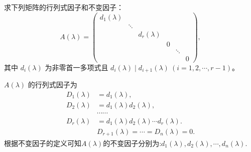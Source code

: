 \documentclass[../../main.tex]{subfiles}
\begin{document}
\begin{proposition}\label{proposition:相抵标准型的行列式因子和不变因子}
求下列矩阵的行列式因子和不变因子：
\[
A(\lambda)=\begin{pmatrix}
d_1(\lambda) & & & & \\
& \ddots & & & \\
& & d_r(\lambda) & & \\
& & & 0 & \\
& & & & \ddots & \\
& & & & & 0
\end{pmatrix},
\]
其中 $d_i(\lambda)$ 为非零首一多项式且 $d_i(\lambda)\mid d_{i + 1}(\lambda)\ (i = 1, 2, \cdots, r - 1)$。
\end{proposition}
\begin{solution}
$A(\lambda)$ 的行列式因子为
\begin{align*}
D_1(\lambda)&=d_1(\lambda),\\
D_2(\lambda)&=d_1(\lambda)d_2(\lambda),\\
&\cdots\cdots\\
D_r(\lambda)&=d_1(\lambda)d_2(\lambda)\cdots d_r(\lambda).
\\
&D_{r+1}(\lambda)=\cdots=D_n(\lambda)=0.
\end{align*}
根据不变因子的定义可知$A(\lambda)$的不变因子分别为:$d_1(\lambda),d_2(\lambda),\cdots,d_n(\lambda).$
\end{solution}
\end{document}
